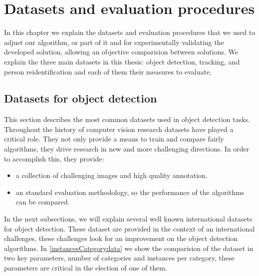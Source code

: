 \chapter{Datasets and evaluation procedures}\label{cap.dataset}


In this chapter we explain the datasets and evaluation procedures that we used to adjust our algorithm, or part of it and for experimentally validating the developed solution, allowing an objective comparision between solutions. We explain the three main datasets in this thesis: object detection, tracking, and person reidentification and each of them their measures to evaluate.

\section{Datasets for object detection}



This section describes the most common datasets used in object detection tasks. Throughout the history of computer vision research datasets have played a critical role.  They not only provide a means to train and compare fairly algorithms, they drive research in new and more challenging directions. In order to accomplish this, they provide:


\begin{itemize}

\item a collection of challenging images and high quality annotation.

\item an standard evaluation methodology, so the performance of the algorithms can be compared. 


\end{itemize}



In the next subsections, we will explain several well known international datasets for object detection. These dataset are provided in the context of an international challenges, these challenges look for an improvement on the object detection algorithms. In \ref{instancesCategorydata} we show the comparision of the dataset in two key parameters, number of categories and instances per category, these parameters are critical in the election of one of them.


